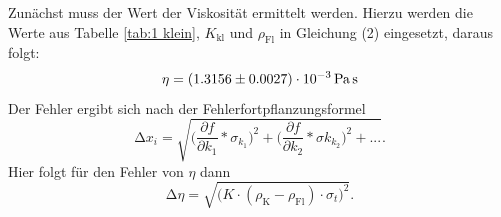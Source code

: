 Zunächst muss der Wert der Viskosität ermittelt werden. Hierzu werden die Werte aus Tabelle \ref{tab:1 klein}, $K_\text{kl}$ und $\rho_\text{Fl}$ in Gleichung (2) eingesetzt, daraus folgt:
\begin{equation*}
	\eta = \SI{1,3156\pm0,0027e-3}{\pascal\second}
\end{equation*}
Der Fehler ergibt sich nach der Fehlerfortpflanzungsformel
\begin{equation}\label{Fehler}
	\increment x_i = \sqrt{\biggl(\frac{\partial f}{\partial k_1} * \sigma_{k_1}\biggr)^2 + \biggl(\frac{\partial f}{\partial k_2} * \sigma k_{k_2}\biggr)^2 + ...}.
\end{equation}
Hier folgt für den Fehler von $\eta$ dann
\begin{equation}\label{Feta}
	\increment \eta = \sqrt{\biggl(K\cdot(\rho_\text{K}-\rho_\text{Fl}) \cdot \sigma_{t}\biggr)^2}.
\end{equation}

